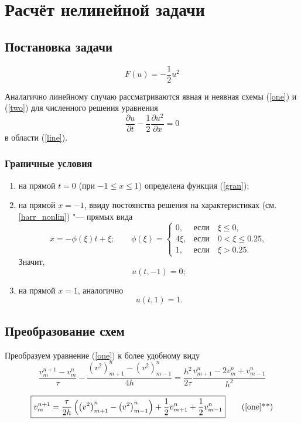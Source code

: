 \newpage
\section{Расчёт нелинейной задачи}

\subsection{Постановка задачи}
\[
F(u) = -\frac{1}{2} u^2
\]

Аналагично линейному случаю рассматриваются явная и неявная схемы (\ref{one}) и (\ref{two}) для численного решения уравнения  
\[
\frac{\partial u}{\partial t} - \frac{1}{2} 
\frac{\partial u^2}{\partial x} = 0
\]
в области (\ref{line}).  

\subsubsection{Граничные условия}
\begin{enumerate}
\item на прямой $t = 0$ (при $-1 \le x \le 1$) определена функция (\ref{gran});
\item на прямой $x = -1$, ввиду постоянства решения на характеристиках (см.\ref{harr_nonlin}) "--- прямых вида 
\[
x = -\phi(\xi)t + \xi; \qquad
\phi(\xi) = 
\begin{cases}
0,& \text{если} \quad \xi \le 0, \\
4\xi,& \text{если} \quad 0 < \xi \le 0.25, \\
1,& \text{если} \quad \xi > 0.25.
\end{cases}
\]
Значит,
\[
u(t,-1) = 0;
\]
\item на прямой $x = 1$, аналогично
\[
u(t,1) = 1.
\] 
\end{enumerate}

\subsection{Преобразование схем}
Преобразуем уравнение (\ref{one}) к более удобному виду
\[
\frac{v_{m}^{n+1} - v_m^n}{\tau} -  \frac{\left(v^2\right)_{m+1}^n -  \left(v^2\right)_{m-1}^n}{4h} = \frac{h^2}{2\tau} \frac{v_{m+1}^n - 2v_{m}^n + v_{m-1}^n}{h^2} 
\]

\begin{align}\label{one2}
\boxed{
 v_{m}^{n+1}  =  \frac{\tau}{2h} \left( \left(v^2\right)_{m+1}^n -   \left(v^2\right)_{m-1}^n \right) + \frac{1}{2}v_{m+1}^n  + \frac{1}{2}v_{m-1}^n 
}
\tag{\ref{one}**}
\end{align}

